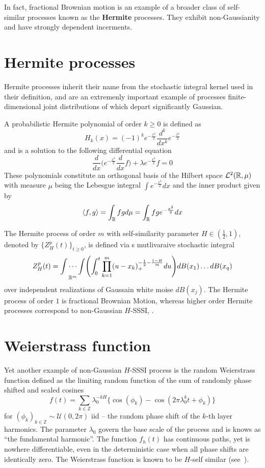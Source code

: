 In fact, fractional Brownian motion is an example of a broader class of self-similar
processes known as the \textbf{Hermite} processes. They exhibit non-Gaussianity and have
strongly dependent incerments.


\section{Hermite processes} %
\label{sec:hermite_processes}

Hermite processes inherit their name from the stochastic integral kernel used
in their definition, and are an extremenly important example of processes finite-
dimensional joint distributions of which depart significantly Gaussian. 

A probabilistic Hermite polynomial of order $k\geq0$ is defined as 
\[ H_k(x) = (-1)^k e^{-\frac{x^2}{2}} \frac{d^k}{dx^k} e^{-\frac{x^2}{2}} \]
and is a solution to the following differential equation
\[
 \frac{d}{dx}\biggl( e^{-\frac{x^2}{2}} \frac{d}{dx} f\biggr) + \lambda e^{-\frac{x^2}{2}} f = 0
\]
These polynomials constitute an orthogonal basis of the Hilbert space $\mathcal{L}^2(\mathbb{R}, \mu)$
with measure $\mu$ being the Lebesgue integral $\int e^{-\frac{x^2}{2}} dx$ and the inner
product given by
\[
\langle f, g\rangle = \int_{\mathbb{R}} f g d\mu = \int_{\mathbb{R}} f g e^{-\frac{x^2}{2}} dx
\]

The Hermite process of order $m$ with self-similarity parameter $H\in(\tfrac{1}{2},1)$,
denoted by $\bigl\{Z_H^p(t)\bigr\}_{t\geq 0}$, is defined via s mutlivaraive stochastic
integral
\[
Z_H^p(t) = \underset{\mathbb{R}^m}{\int \cdots \int} \Biggl(
\int^t_0 \prod_{k=1}^m (u-x_k)_+^{-\frac{1}{2}-\frac{1-H}{m}} du\Biggr) dB(x_1) \ldots dB(x_q)
\]
over independent realizations of Gaussain white moise $dB(x_j)$.
The Hermite process of order $1$ is fractional Brownian Motion, whereas higher order
Hermite processes correspond to non-Gaussian $H$-SSSI, \cite{Bai20141710}.


\section{Weierstrass function} %
\label{sec:weierstrass_function}

Yet another example of non-Gaussian $H$-SSSI process is the random Weierstrass function
defined as the limiting random function of the sum of randomly phase shifted and scaled
cosines
\[
f(t)
= \sum_{k\in \mathbb{Z}} \lambda_0^{-kH}\bigl\{ \cos(\phi_k)
- \cos(2\pi \lambda_0^k t + \phi_k) \bigr\} 
\]
for $(\phi_k)_{k\in\mathbb{Z}}\sim \mathcal{U}(0,2\pi)$ iid -- the random phase shift of
the $k$-th layer harmonics. The parameter $\lambda_0$ govern the base scale of the
process and is knows as ``the fundamental harmonic''. The function $f_h(t)$ has
continuous paths, yet is nowhere differentiable, even in the deterministic case
when all phase shifts are identically zero. The Weierstrass function is known to be
$H$-self similar (see~\cite{decrouez2013estimation}).


